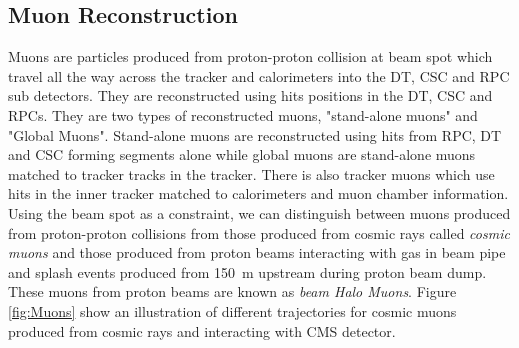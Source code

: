 \subsection{Muon Reconstruction}
Muons are particles produced from proton-proton collision at beam spot which travel all the way across the tracker and calorimeters into 
the DT, CSC and RPC sub detectors. They are reconstructed using hits positions in the DT, CSC and RPCs.
They are two types of reconstructed muons, "stand-alone muons" and "Global Muons". Stand-alone muons are reconstructed using hits from RPC, DT and CSC forming segments alone while global muons are stand-alone muons matched to tracker tracks in the tracker. There is also tracker muons which use hits in the inner tracker matched to calorimeters and muon chamber information.
Using the beam spot as a constraint, we can distinguish between muons produced from proton-proton collisions from those produced from
cosmic rays called \textit{cosmic muons} and those produced from proton beams interacting with gas in beam pipe and splash events produced from 150~m upstream during proton beam dump. These muons from proton beams are known as \textit{beam Halo Muons}.
Figure \ref{fig:Muons} show an illustration of different trajectories for cosmic muons produced from cosmic rays and interacting with CMS detector. %


